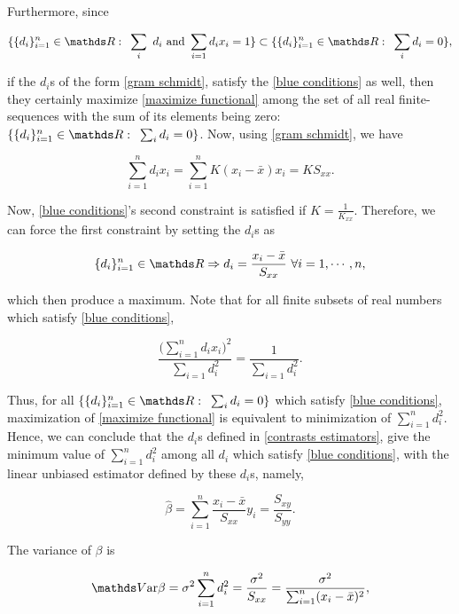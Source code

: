 \documentclass{homework}
\begin{document}
Furthermore, since 

$$
\{\{d_i\}_{i=1}^{n} \in \R: \blank \sum_{i}\ d_i \textnormal{ and } \sum_{i=1} d_i x_i = 1 \} \subset \{\{d_i\}_{i=1}^{n} \in \R : \blank \sum_{i} d_i = 0\},
$$

if the $d_i$s of the form \eqref{gram schmidt}, satisfy the \eqref{blue conditions} as well, then they certainly maximize 
\eqref{maximize functional} among the set of all real finite-sequences with the sum of its elements being zero: $\{\{d_i\}_{i=1}^{n} \in \R : \blank \sum_{i} d_i = 0\}$. Now, using \eqref{gram schmidt}, we have 

\begin{equation}
    \sum_{i=1}^{n} d_i x_i = \sum_{i=1}^{n} K(x_i - \bar{x}) x_i = K S_{xx}.
\end{equation}

Now, \eqref{blue conditions}'s second constraint is satisfied if $K = \frac{1}{K_{xx}}$. Therefore, we can force the first constraint by setting the $d_i$s as 

\begin{equation}
  \{d_i\}_{i=1}^{n} \in \R \Rightarrow d_i = \frac{x_i - \bar{x}}{S_{xx}} \blank \forall i = 1, \cdots, n,
  \label{contrasts estimators}
\end{equation}

which then produce a maximum. Note that for all finite subsets of real numbers which satisfy \eqref{blue conditions}, 

$$
\frac{\bigg(\sum_{i=1}^{n} d_i x_i\bigg)^2}{\sum_{i=1} d_i^2} = \frac{1}{\sum_{i=1} d_i^2}.
$$

Thus, for all $\{\{d_i\}_{i=1}^{n} \in \R : \blank \sum_{i} d_i = 0\}$ which satisfy \eqref{blue conditions}, maximization of \eqref{maximize functional} is equivalent to minimization of $\sum_{i=1}^{n} d_i^2$. Hence, we can conclude that the $d_i$s defined in \eqref{contrasts estimators}, give the minimum value of $\sum_{i=1}^{n} d_i^2$ among all $d_i$ which satisfy \eqref{blue conditions}, with the linear unbiased estimator defined by these $d_i$s, namely,

\begin{equation}
    \hat{\beta} = \sum_{i=1}^{n} \frac{x_i - \bar{x}}{S_{xx}} y_i = \frac{S_{xy}}{S_{yy}}.
\end{equation}

The variance of $\beta$ is 

\begin{equation}
    \var \beta = \sigma^2 \sum_{i=1}^{n} d_i^2 = \frac{\sigma^2}{S_{xx}} = \frac{\sigma^2}{\sum_{i=1}^{n} (x_i - \bar{x})^2},
\end{equation}
\end{document}
